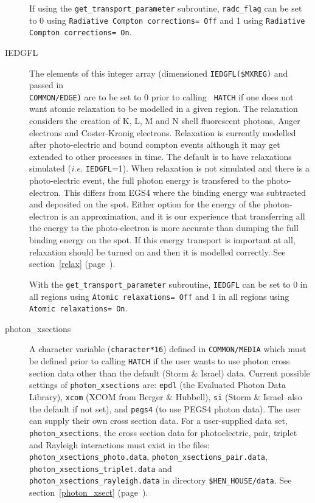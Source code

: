 \begin{description}
If using the {\tt get\_transport\_parameter} subroutine, {\tt radc\_flag}
can be set to 0 using {\tt Radiative Compton corrections= Off} and 1 using
{\tt Radiative Compton corrections= On}.

\item[IEDGFL] The elements of this integer array (dimensioned {\tt IEDGFL(\$MXREG)}
and passed in\\ {\tt COMMON/EDGE)} are to be set to 0 prior to calling {\tt
HATCH}
if one does not want atomic relaxation to be modelled in a given region. The
relaxation considers the creation of K, L, M and N shell fluorescent
photons, Auger electrons and Coster-Kronig electrons.  Relaxation is
currently modelled after photo-electric and bound compton events although
it may get extended to other processes in time. The default is to
have relaxations simulated ({\em i.e.} {\tt IEDGFL}=1).  When relaxation is not simulated and there
is a photo-electric event, the full photon energy is transfered to the
photo-electron.  This differs from EGS4 where the binding energy was
subtracted and deposited on the spot.  Either option for the energy of the
photon-electron is an approximation, and
it is our experience that transferring all the energy to the photo-electron
is more accurate than dumping the full binding energy on the spot.  If this
energy transport is important at all, relaxation should be turned on and
then it is modelled correctly. See section~\ref{relax}
(page~\pageref{relax}).

With the {\tt get\_transport\_parameter} subroutine, {\tt IEDGFL} can be set
to 0 in all regions using {\tt Atomic relaxations= Off} and 1 in all
regions using {\tt Atomic relaxations= On}.

\label{photon_xsections_description}
\item[photon\_xsections] A character variable ({\tt character*16}) defined
in {\tt COMMON/MEDIA} which must be defined prior to calling {\tt HATCH}
if the user wants to use photon cross section data other than the default
(Storm \& Israel\cite{SI70}) data.  Current possible settings of
{\tt photon\_xsections} are: {\tt epdl} (the Evaluated Photon Data
Library\cite{Cu90}), {\tt xcom} (XCOM from Berger \& Hubbell\cite{BH87}),
{\tt si} (Storm \& Israel--also the default if not set),
and {\tt pegs4} (to use PEGS4 photon data).
The user can supply their own cross section data.  For a user-supplied data
set, {\tt photon\_xsections}, the cross section data for photoelectric,
pair, triplet and Rayleigh interactions must exist in the files:
{\tt photon\_xsections\_photo.data}, {\tt photon\_xsections\_pair.data},
{\tt photon\_xsections\_triplet.data} and\\
 {\tt photon\_xsections\_rayleigh.data}
in directory {\tt \$HEN\_HOUSE/data}.  See section~\ref{photon_xsect}
(page~\pageref{photon_xsect}).


\end{description}
